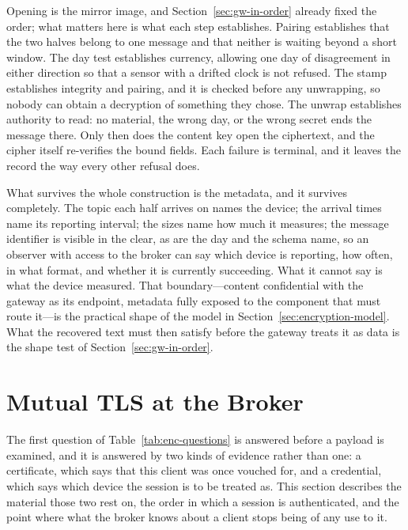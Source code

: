 \documentclass[12pt,a4paper]{report}
\begin{document}
Opening is the mirror image, and Section~\ref{sec:gw-in-order} already fixed
the order; what matters here is what each step establishes. Pairing
establishes that the two halves belong to one message and that neither is
waiting beyond a short window. The day test establishes currency, allowing
one day of disagreement in either direction so that a sensor with a drifted
clock is not refused. The stamp establishes integrity and pairing, and it is
checked before any unwrapping, so nobody can obtain a decryption of
something they chose. The unwrap establishes authority to read: no material,
the wrong day, or the wrong secret ends the message there. Only then does
the content key open the ciphertext, and the cipher itself re-verifies the
bound fields. Each failure is terminal, and it leaves the record the way
every other refusal does.

What survives the whole construction is the metadata, and it survives
completely. The topic each half arrives on names the device; the arrival
times name its reporting interval; the sizes name how much it measures; the
message identifier is visible in the clear, as are the day and the schema
name, so an observer with access to the broker can say which device is
reporting, how often, in what format, and whether it is currently succeeding.
What it cannot say is what the device measured. That boundary---content
confidential with the gateway as its endpoint, metadata fully exposed to the
component that must route it---is the practical shape of the model in
Section~\ref{sec:encryption-model}. What the recovered text must then satisfy
before the gateway treats it as data is the shape test of
Section~\ref{sec:gw-in-order}.


\section{Mutual TLS at the Broker}
\label{sec:encryption-mtls}

The first question of Table~\ref{tab:enc-questions} is answered before a
payload is examined, and it is answered by two kinds of evidence rather than
one: a certificate, which says that this client was once vouched for, and a
credential, which says which device the session is to be treated as. This
section describes the material those two rest on, the order in which a
session is authenticated, and the point where what the broker knows about a
client stops being of any use to it.
\end{document}
